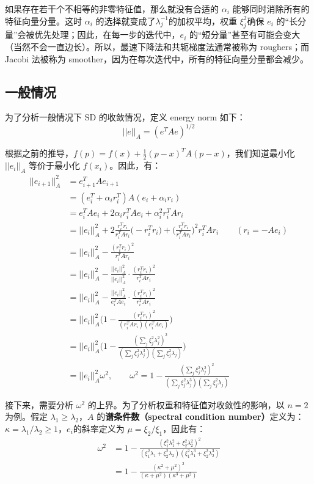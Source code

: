 \documentclass[12pt]{article}
\begin{document}
如果存在若干个不相等的非零特征值，那么就没有合适的 $\alpha_i$ 能够同时消除所有的特征向量分量。这时 $\alpha_i$ 的选择就变成了$\lambda_j^{-1}$的加权平均，权重 $\xi^2_j$确保 $e_i$ 的“长分量”会被优先处理；因此，在每一步的迭代中，$e_i$ 的“短分量”甚至有可能会变大（当然不会一直边长）。所以，最速下降法和共轭梯度法通常被称为 roughers；而 Jacobi 法被称为 smoother，因为在每次迭代中，所有的特征向量分量都会减少。

\subsection{一般情况}
为了分析一般情况下 SD 的收敛情况，定义 energy norm 如下：
$$
||e||_A = (e^TAe)^{1/2}
$$

根据之前的推导，$f(p) = f(x) + \frac{1}{2}(p-x)^TA(p-x)$，我们知道最小化 $||e_i||_A$ 等价于最小化 $f(x_i)$。因此，有：
\begin{align*}
||e_{i+1}||^2_A &= e^T_{i+1}Ae_{i+1} \\
	&= (e^T_i + \alpha_i r^T_i)A(e_i + \alpha_i r_i) \\
	&= e^T_iAe_i + 2\alpha_ir^T_iAe_i + \alpha^2_ir^T_iAr_i \\
	&= ||e_i||^2_A + 2\frac{r^T_ir_i}{r^T_iAr_i}\Big(-r^T_ir_i\Big) + \Big(\frac{r^T_ir_i}{r^T_iAr_i}\Big)^2r^T_iAr_i  \qquad (r_i = -Ae_i)\\
	&= ||e_i||^2_A - \frac{(r^T_ir_i)^2}{r^T_iAr_i} \\
	&=  ||e_i||^2_A - \frac{||e_i||^2_A}{ ||e_i||^2_A}\cdot\frac{(r^T_ir_i)^2}{r^T_iAr_i} \\
	&=  ||e_i||^2_A - \frac{||e_i||^2_A}{e^T_iAe_i}\cdot\frac{(r^T_ir_i)^2}{r^T_iAr_i} \\
	&= ||e_i||^2_A \Bigg(1 - \frac{(r^T_ir_i)^2}{(r^T_iAr_i)(e^T_iAe_i)}\Bigg) \\
	&= ||e_i||^2_A \Bigg(1 - \frac{(\sum_j\xi_j^2\lambda_j^2)^2}{(\sum_j\xi_j^2\lambda_j^3)(\sum_j\xi_j^2\lambda_j)}\Bigg) \\
	&= ||e_i||^2_A\omega^2, \qquad \omega^2 = 1 - \frac{(\sum_j\xi_j^2\lambda_j^2)^2}{(\sum_j\xi_j^2\lambda_j^3)(\sum_j\xi_j^2\lambda_j)}
\end{align*}

接下来，需要分析 $\omega^2$ 的上界。为了分析权重和特征值对收敛性的影响，以 $n=2$ 为例。假定 $\lambda_1 \ge \lambda_2$，$A$ 的\textbf{谱条件数（spectral condition number）}定义为：
$\kappa = \lambda_1 / \lambda_2 \ge 1$，$e_i$的斜率定义为 $\mu = \xi_2 / \xi_1$，因此有：
\begin{align*}
\omega^2 &= 1 - \frac{(\xi_1^2\lambda_1^2 + \xi_2^2\lambda_2^2)^2}{(\xi_1^2\lambda_1 + \xi_2^2\lambda_2)(\xi_1^2\lambda_1^3 + \xi_2^2\lambda_2^3)} \\
	&= 1 - \frac{(\kappa^2 + \mu^2)^2}{(\kappa + \mu^2)(\kappa^3 + \mu^2)}
\end{align*}
\end{document}
